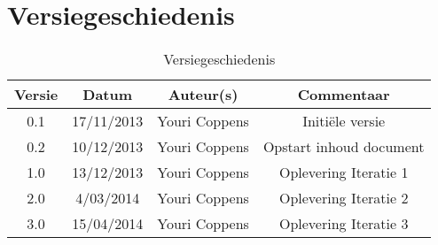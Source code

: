 \chapter{Versiegeschiedenis}

\begin{table}[htbp]
	\centering
	\begin{tabular} {|c|c|c|c|}
	    \hline
		\textbf{Versie} & \textbf{Datum} 	& \textbf{Auteur(s)} & \textbf{Commentaar} \\
		\hline
		0.1	& 17/11/2013	& Youri Coppens	& Initi\"{e}le versie\\
		\hline
		0.2	& 10/12/2013	& Youri Coppens	& Opstart inhoud document\\
		\hline
		1.0	& 13/12/2013	& Youri Coppens	& Oplevering Iteratie 1\\ 
		\hline
		2.0	& 4/03/2014	& Youri Coppens	& Oplevering Iteratie 2\\
		\hline
		3.0	& 15/04/2014	& Youri Coppens	& Oplevering Iteratie 3\\
		\hline
	\end{tabular}
	\caption{Versiegeschiedenis}
\end{table}